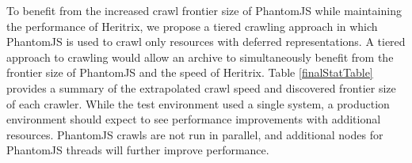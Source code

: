 \documentclass{ipres_proc_article-sp}
\begin{document}
To benefit from the increased crawl frontier size of PhantomJS while maintaining the performance of Heritrix, we propose a tiered crawling approach in which PhantomJS is used to crawl only resources with deferred representations. 
A tiered approach to crawling would allow an archive to simultaneously benefit from the frontier size of PhantomJS and the speed of Heritrix. 
Table \ref{finalStatTable} provides a summary of the extrapolated crawl speed and discovered frontier size of each crawler. While the test environment used a single system, a production environment should expect to see performance improvements with additional resources. PhantomJS crawls are not run in parallel, and additional nodes for PhantomJS threads will further improve performance.
\end{document}
